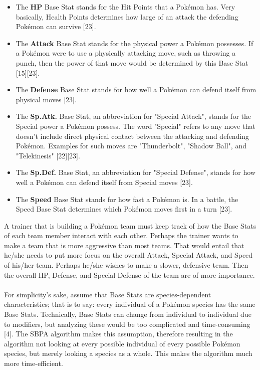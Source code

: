 \documentclass{article}
\begin{document}
\begin{itemize}
	\item The \textbf{HP} Base Stat stands for the Hit Points that a Pok\'emon has. Very basically, Health Points determines how large of an attack the defending Pok\'emon can survive [23].
	\item The \textbf{Attack} Base Stat stands for the physical power a Pok\'emon possesses. If a Pok\'emon were to use a physically attacking move, such as throwing a punch, then the power of that move would be determined by this Base Stat [15][23]. 
	\item The \textbf{Defense} Base Stat stands for how well a Pok\'emon can defend itself from physical moves [23]. 
	\item The \textbf{Sp.Atk.} Base Stat, an abbreviation for "Special Attack", stands for the Special power a Pok\'emon possess. The word "Special" refers to any move that doesn't include direct physical contact between the attacking and defending Pok\'emon. Examples for such moves are "Thunderbolt", "Shadow Ball", and "Telekinesis" [22][23].
	\item The \textbf{Sp.Def.} Base Stat, an abbreviation for "Special Defense", stands for how well a Pok\'emon can defend itself from Special moves [23].
	\item The \textbf{Speed} Base Stat stands for how fast a Pok\'emon is. In a battle, the Speed Base Stat determines which Pok\'emon moves first in a turn [23].
\end{itemize}
A trainer that is building a Pok\'emon team must keep track of how the Base Stats of each team member interact with each other. Perhaps the trainer wants to make a team that is more aggressive than most teams. That would entail that he/she needs to put more focus on the overall Attack, Special Attack, and Speed of his/her team. Perhaps he/she wishes to make a slower, defensive team. Then the overall HP, Defense, and Special Defense of the team are of more importance.\\\\
For simplicity's sake, assume that Base Stats are species-dependent characteristics; that is to say: every individual of a Pok\'emon species has the same Base Stats. Technically, Base Stats can change from individual to individual due to modifiers, but analyzing these would be too complicated and time-consuming [4]. The SBPA algorithm makes this assumption, therefore resulting in the algorithm not looking at every possible individual of every possible Pok\'emon species, but merely looking a species as a whole. This makes the algorithm much more time-efficient.
\end{document}
